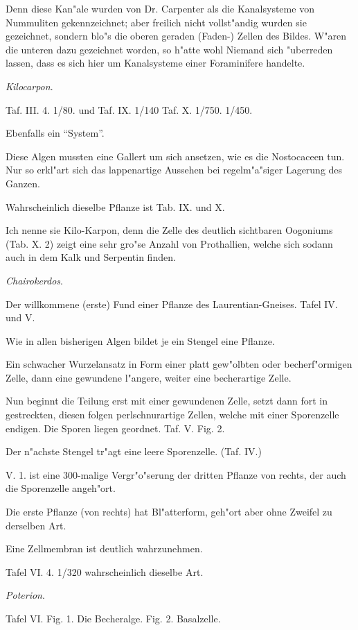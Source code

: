 \documentclass[a4paper, 11pt, oneside, german]{article}
\begin{document}
Denn diese Kan"ale wurden von Dr. Carpenter als die Kanalsysteme von Nummuliten gekennzeichnet; aber freilich nicht vollst"andig wurden sie gezeichnet, sondern blo"s die oberen geraden (Faden-) Zellen des Bildes. W"aren die unteren dazu gezeichnet worden, so h"atte wohl Niemand sich "uberreden lassen, dass es sich hier um Kanalsysteme einer Foraminifere handelte.

\centerline{\emph{Kilocarpon}.}

Taf. III. 4. 1/80. und Taf. IX. 1/140 Taf. X. 1/750. 1/450.

Ebenfalls ein "`System"'.

Diese Algen mussten eine Gallert um sich ansetzen, wie es die Nostocaceen tun. Nur so erkl"art sich das lappenartige Aussehen bei regelm"a"siger Lagerung des Ganzen.

Wahrscheinlich dieselbe Pflanze ist Tab. IX. und X.

Ich nenne sie Kilo-Karpon, denn die Zelle des deutlich sichtbaren Oogoniums (Tab. X. 2) zeigt eine sehr gro"se Anzahl von Prothallien, welche sich sodann auch in dem Kalk und Serpentin finden.

\centerline{\emph{Chairokerdos}.}

Der willkommene (erste) Fund einer Pflanze des Laurentian-Gneises. Tafel IV. und V.

Wie in allen bisherigen Algen bildet je ein Stengel eine Pflanze.

Ein schwacher Wurzelansatz in Form einer platt gew"olbten oder becherf"ormigen Zelle, dann eine gewundene l"angere, weiter eine becherartige Zelle.

Nun beginnt die Teilung erst mit einer gewundenen Zelle, setzt dann fort in gestreckten, diesen folgen perlschnurartige Zellen, welche mit einer Sporenzelle endigen. Die Sporen liegen geordnet. Taf. V. Fig. 2.

Der n"achste Stengel tr"agt eine leere Sporenzelle. (Taf. IV.)

V. 1. ist eine 300-malige Vergr"o"serung der dritten Pflanze von rechts, der auch die Sporenzelle angeh"ort.

Die erste Pflanze (von rechts) hat Bl"atterform, geh"ort aber ohne Zweifel zu derselben Art.

Eine Zellmembran ist deutlich wahrzunehmen.

Tafel VI. 4. 1/320 wahrscheinlich dieselbe Art.

\centerline{\emph{Poterion}.}

Tafel VI. Fig. 1. Die Becheralge. Fig. 2. Basalzelle.
\end{document}
